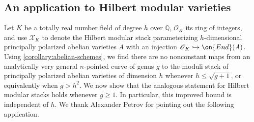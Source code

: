 \documentclass[12 pt]{amsart}
\theoremstyle{plain}
\theoremstyle{definition}
\theoremstyle{remark}
\numberwithin{equation}{section}
\begin{document}
\subsection{An application to Hilbert modular varieties}
\label{subsection:hilbert-modular}

Let $K$ be a totally real number field of degree $h$ over $\mathbb Q$, $\mathscr O_K$ its ring of integers, and 
use $\mathscr X_K$ to denote the Hilbert modular stack parameterizing
$h$-dimensional principally polarized abelian varieties $A$ with an injection
$\mathscr O_K \hookrightarrow \on{End}(A)$.
Using \autoref{corollary:abelian-schemes}, we find there are no nonconstant maps
from an analytically very general $n$-pointed curve of genus $g$
to the moduli stack of principally polarized abelian varieties of dimension $h$
whenever $h \leq \sqrt{g+1}$, or equivalently when $g > h^2$.
We now show that the analogous statement for Hilbert modular stacks holds
whenever $g \geq 1$.
In particular, this improved bound is independent of $h$.
We thank Alexander Petrov for pointing out the following application.
\end{document}
